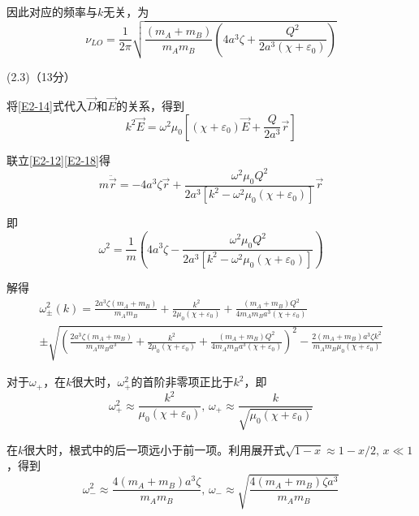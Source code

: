 \documentclass[10pt,a4paper,onecolumn,UTF8]{ctexart}
\begin{document}
	因此对应的频率与$k$无关，为
	\begin{equation}\label{E2-17}
		\nu_{LO}=\frac 1 {2\pi}\sqrt{\frac{(m_A+m_B)}{m_Am_B}\left(4a^3\zeta+\frac{Q^2}{2a^3(\chi+\varepsilon_0)}\right)}
	\end{equation}
	
	(2.3)（13分）
	
	将\eqref{E2-14}式代入$\vec D$和$\vec E$的关系，得到
	\begin{equation}\label{E2-18}
		k^2\vec{E}=\omega^2\mu_0\left[(\chi+\varepsilon_0)\vec E+\frac{Q}{2a^3}\vec r\right]
	\end{equation}
	
	联立\eqref{E2-12}\eqref{E2-18}得
	\begin{equation}\label{E2-19}
		m\ddot{\vec r}=-4a^3\zeta\vec r+\frac{\omega^2\mu_0Q^2}{2a^3\left[k^2-\omega^2\mu_0(\chi+\varepsilon_0)\right]}\vec r
	\end{equation}
	
	即
	\begin{equation}\label{E2-20}
		\omega^2=\frac{1}{m}\left(4a^3\zeta-\frac{\omega^2\mu_0Q^2}{2a^3\left[k^2-\omega^2\mu_0(\chi+\varepsilon_0)\right]}\right)
	\end{equation}
	
	解得
	\begin{multline}\label{E2-21}
		\omega^2_{\pm}(k)=\frac{2a^3\zeta(m_A+m_B)}{m_Am_B}+\frac{k^2}{2\mu_0(\chi+\varepsilon_0)}+\frac{(m_A+m_B)Q^2}{4m_Am_Ba^3(\chi+\varepsilon_0)}\\ \pm\sqrt{\left(\frac{2a^3\zeta(m_A+m_B)}{m_Am_Ba^3}+\frac{k^2}{2\mu_0(\chi+\varepsilon_0)}+\frac{(m_A+m_B)Q^2}{4m_Am_Ba^3(\chi+\varepsilon_0)}\right)^2-\frac{2(m_A+m_B)a^3\zeta k^2}{m_Am_B\mu_0(\chi+\varepsilon_0)}}
	\end{multline}
	
	对于$\omega_+$，在$k$很大时，$\omega_+^2$的首阶非零项正比于$k^2$，即
	\begin{equation}\label{E2-22}
		\omega^2_+\approx\frac{k^2}{\mu_0(\chi+\varepsilon_0)},\,\omega_+\approx\frac{k}{\sqrt{\mu_0(\chi+\varepsilon_0)}}
	\end{equation}
	
	在$k$很大时，根式中的后一项远小于前一项。利用展开式$\sqrt{1-x}\approx 1-x/2,\,x\ll1$，得到
	\begin{equation}\label{E2-23}
		\omega_-^2\approx\frac{4(m_A+m_B)a^3\zeta }{m_Am_B},\,\omega_-\approx\sqrt{\frac{4(m_A+m_B)\zeta a^3 }{m_Am_B}}
	\end{equation}
	
\end{document}
